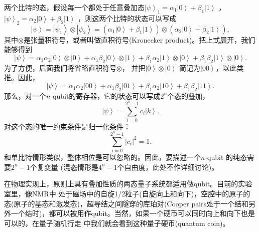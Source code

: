 两个比特的态，假设每一个都处于任意叠加态$ \left\vert \psi \right\rangle_1= \alpha_1  \left\vert 0 \right\rangle + \beta_1  \left\vert 1 \right\rangle$ ，$ \left\vert \psi \right\rangle_2= \alpha_2  \left\vert 0 \right\rangle + \beta_2 \left\vert 1 \right\rangle$ ，则这两个比特的状态可以写成
 \begin{equation}
           \left\vert \psi \right\rangle=\left\vert \psi_1 \right\rangle \otimes \left\vert \psi_2 \right\rangle= (\alpha_1  \left\vert 0 \right\rangle + \beta_1  \left\vert 1 \right\rangle)\otimes( \alpha_2  \left\vert 0 \right\rangle + \beta_2 \left\vert 1 \right\rangle),\label{sepa}
 \end{equation}
 其中$\otimes$是张量积符号，或者叫做直积符号(Kronecker product)。把上式展开，我们能够得到
   \begin{equation}
           \left\vert \psi \right\rangle=  \alpha_1  \alpha_2 \left\vert 0 \right\rangle \otimes \left\vert 0 \right\rangle+\alpha_1  \beta_2 \left\vert 0 \right\rangle \otimes \left\vert 1 \right\rangle+\beta_1  \alpha_2 \left\vert 1 \right\rangle \otimes \left\vert 0 \right\rangle+\beta_1  \beta_2 \left\vert 1 \right\rangle \otimes \left\vert 0 \right\rangle.
 \end{equation}
为了方便，后面我们将省略直积符号$\otimes$， 并把$\left\vert 0 \right\rangle \otimes \left\vert 0 \right\rangle$ 简记为$\left\vert 00 \right\rangle$，以此类推。因此，
 \begin{equation}
           \left\vert \psi \right\rangle=  \alpha_1  \alpha_2 \left\vert 00 \right\rangle +\alpha_1  \beta_2 \left\vert 01 \right\rangle +\beta_1  \alpha_2 \left\vert 10 \right\rangle+\beta_1  \beta_2 \left\vert 11 \right\rangle.
 \end{equation}
 那么，对一个$n$-qubit的寄存器，它的状态可以写成$2^n$个态的叠加，
  \begin{equation}
           \left\vert \psi \right\rangle=  \sum _{i=0}^{2^n-1}c_i \left\vert k \right\rangle.
 \end{equation}
  对这个态的唯一约束条件是归一化条件：
   \begin{equation}
             \sum _{i=0}^{2^n-1} |c_i|^2 =1.
 \end{equation}
 和单比特情形类似，整体相位是可以忽略的。因此，要描述一个$n$-qubit 的纯态需要$2^n-1$个复变量 (混态情形是$4^n-1$个自由度，此处不作详细讨论)。

 在物理实现上，原则上具有叠加性质的两态量子系统都适用做qubit。目前的实验室里，像NMR中
 处于磁场中的自旋1/2粒子(自旋向上和向下)，空腔中的原子的态(原子的基态和激发态)，超导结之间隧穿的库珀对(Cooper pairs处于一个结和另外一个结时)，都可以被用作qubit。当然，如果一个硬币可以同时向上和向下也是可以的，在量子随机行走
 中我们就会看到这种量子硬币(quantum coin)。

